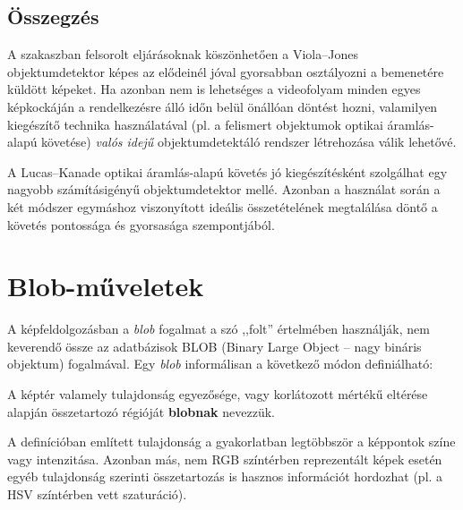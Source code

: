 \subsection{Összegzés}\label{sect:detect_osszefoglalas}

A  szakaszban felsorolt eljárásoknak köszönhetően a Viola--Jones objektumdetektor képes az elődeinél jóval gyorsabban osztályozni a bemenetére küldött képeket. Ha azonban nem is lehetséges a videofolyam minden egyes képkockáján a rendelkezésre álló időn belül önállóan döntést hozni, valamilyen kiegészítő technika használatával (pl. a felismert objektumok optikai áramlás-alapú követése) \emph{valós idejű} objektumdetektáló rendszer létrehozása válik lehetővé.

A Lucas--Kanade optikai áramlás-alapú követés jó kiegészítésként szolgálhat egy nagyobb számításigényű objektumdetektor mellé. Azonban a használat során a két módszer egymáshoz viszonyított ideális összetételének megtalálása döntő a követés pontossága és gyorsasága szempontjából. 




\newpage
\section{Blob-műveletek}\label{sect:blob}

A képfeldolgozásban a \emph{blob} fogalmat a szó ,,folt'' értelmében használják, nem keverendő össze az adatbázisok BLOB (Binary Large Object -- nagy bináris objektum) fogalmával. Egy \emph{blob} informálisan a következő módon definiálható:

\begin{definition}
A képtér valamely tulajdonság egyezősége, vagy korlátozott mértékű eltérése alapján összetartozó régióját \textbf{blobnak} nevezzük.
\end{definition}

A definícióban említett tulajdonság a gyakorlatban legtöbbször a képpontok színe vagy intenzitása. Azonban más, nem RGB színtérben reprezentált képek esetén egyéb tulajdonság szerinti összetartozás is hasznos információt hordozhat (pl. a HSV színtérben vett szaturáció).

\bigskip

